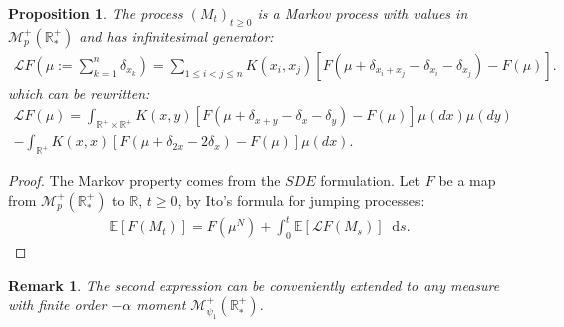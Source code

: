 \documentclass[11pt,a4paper]{article}
\newcommand{\RR}{\mathbb{R}}
\newcommand{\RRP}{\mathbb{R}^+_*}
\newcommand{\MC}{\mathcal{M}}
\newcommand{\LC}{\mathcal{L}}
\newcommand{\E}[1]{\mathbb{E}\left[#1\right]}
\newcommand{\Proc}[1]{\left(#1\right)_{t\geq 0}}
\newcommand{\dd}{\mathop{}\!\mathrm{d}}
\newtheorem{remark}[theorem]{Remark}
\newtheorem{proposition}[theorem]{Proposition}
\begin{document}
\begin{proposition}
    The process $\Proc{M_t}$  is a Markov process with values in $\MC_p^+(\RRP)$ and has infinitesimal generator:
    \begin{align*}
        \LC F\left(\mu := \sum\limits_{k = 1}^n\delta_{x_k} \right) = \sum\limits_{1\le i <j \le n} K(x_i,x_j) \left[F\left(\mu + \delta_{x_i + x_j} - \delta_{x_i} -\delta_{x_j}\right) - F(\mu)\right].
    \end{align*}
    which can be rewritten:
    \begin{multline*}
        \LC F(\mu) = \int_{\RR^+ \times \RR^+} K(x,y)\left[ F\left(\mu + \delta_{x+y} - \delta_x - \delta_y \right) - F(\mu) \right]\mu(dx)\mu(dy) \\
        -\int_{\RR^+} K(x,x)\left[ F\left(\mu + \delta_{2x} - 2\delta_x \right) - F(\mu) \right]\mu(dx).
    \end{multline*}
\end{proposition}
\begin{proof}
    The Markov property comes from the $SDE$ formulation. Let $F$ be a map from $\MC_p^+(\RRP)$ to $\RR$, $t \geq 0$, by Ito's formula for jumping processes:
    \begin{align*}
        \E{F(M_t)} = F(\mu^N) + \int_0^t \E{\LC F\left(M_s\right)} \dd s.
    \end{align*}
\end{proof}
\begin{remark}
    The second expression can be conveniently extended to any measure with finite order $-\alpha$ moment $\MC_{\psi_1}^+(\RRP)$.
\end{remark}
\end{document}

